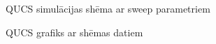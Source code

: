 \documentclass{report}
\begin{document}
\begin{figure}[]
\caption{QUCS simulācijas shēma ar sweep parametriem }
\label{4}
\end{figure}

\begin{figure}[]
\caption{QUCS grafiks ar shēmas datiem }
\label{5}
\end{figure}
\end{document}
